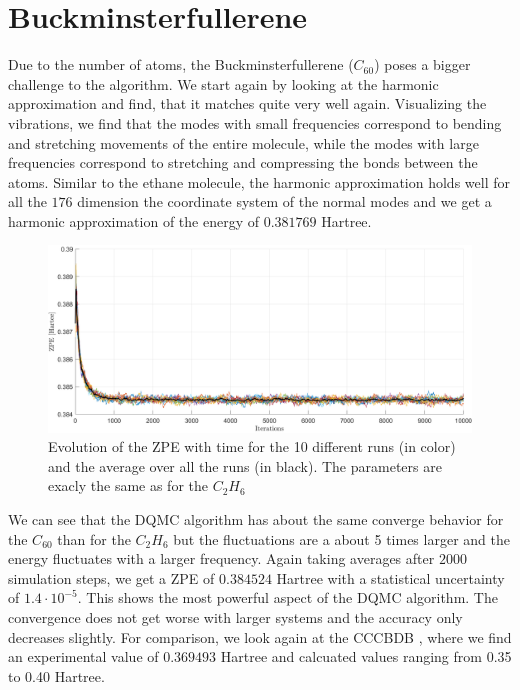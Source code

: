 \documentclass [12pt]{report}
\begin{document}
\section{Buckminsterfullerene}
Due to the number of atoms, the Buckminsterfullerene ($C_{60}$) poses a bigger challenge to the algorithm. We start again by looking at the harmonic approximation and find, that it matches quite very well again. Visualizing the vibrations, we find that the modes with small frequencies correspond to bending and stretching movements of the entire molecule, while the modes with large frequencies correspond to stretching and compressing the bonds between the atoms. 
Similar to the ethane molecule, the harmonic approximation holds well for all the $176$ dimension the coordinate system of the normal modes and we get a harmonic approximation of the energy of $0.381769$ Hartree.

\begin{figure}[h]
\includegraphics[width=\linewidth] {c60_1.png}
\caption{Evolution of the ZPE with time for the 10 different runs (in color) and the average over all the runs (in black). The parameters are exacly the same as for the $C_2H_6$} \label{c60_1}
\end{figure}

We can see that the DQMC algorithm has about the same converge behavior for the $C_{60}$ than for the $C_2H_6$ but the fluctuations are a about 5 times larger and the energy fluctuates with a larger frequency. Again taking averages after $2000$ simulation steps, we get a ZPE of $0.384524$ Hartree with a statistical uncertainty of $1.4 \cdot 10^{-5}$. This shows the most powerful aspect of the DQMC algorithm. The convergence does not get worse with larger systems and the accuracy only decreases slightly. For comparison, we look again at the CCCBDB \cite{cccbdb}, where we find an experimental value of  $0.369493$ Hartree and calcuated values ranging from 0.35 to 0.40 Hartree.\\
\end{document}
